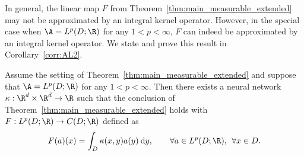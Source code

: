 In general, the linear map \(F\) from Theorem~\ref{thm:main_measurable_extended} may not be approximated by an integral kernel operator. However, in the special case when \(\A = L^p(D;\R)\) for any \(1 < p < \infty\), \(F\) can indeed be approximated by an integral kernel operator. We state  and prove this result in Corollary~\ref{corr:AL2}.

\begin{corollary}
\label{corr:AL2}
Assume the setting of Theorem~\ref{thm:main_measurable_extended} and suppose that \(\A = L^p(D;\R)\) for any \(1 < p < \infty\). Then there exists a neural network \(\kappa : \R^d \times \R^d \to \R\) such that the conclusion of Theorem~\ref{thm:main_measurable_extended} holds with \(F: L^p(D;\R) \to C(D;\R)\) defined as 
\[F(a)(x) = \int_D \kappa(x, y) a(y) \: \text{d}y, \qquad \forall a \in L^p(D;\R), \:\: \forall x \in D.\]
\end{corollary}
